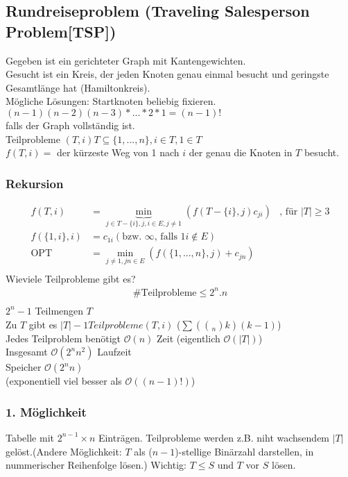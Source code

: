 \subsection{Rundreiseproblem (Traveling Salesperson Problem[TSP])}
Gegeben ist ein gerichteter Graph mit Kantengewichten.\\
Gesucht ist ein Kreis, der jeden Knoten genau einmal besucht und geringste Gesamtlänge hat (Hamiltonkreis).\\
Mögliche Lösungen: Startknoten beliebig fixieren.\\
$(n-1)(n-2)(n-3)*...*2*1=(n-1)!$\\
falls der Graph vollständig ist.\\
Teilprobleme $(T,i) T \subseteq \{1,...,n\}, i \in T, 1 \in T$\\
$f(T,i)=$ der kürzeste Weg von 1 nach $i$ der genau die Knoten in $T$ besucht.\\
\subsubsection{Rekursion}
\begin{align*}
f(T,i) &= \underbrace{\min}_{j \in T-\{i\}, j, i \in E, j \neq 1}(f(T-\{i\},j)c_{ji})&\text{, für } |T| \geq 3\\
f(\{1,i\},i) &= c_{1i} (\text{bzw. }\infty\text{, falls }1i \notin E)\\
\text{OPT}&=\min_{j\neq1, jn \in E}(f(\{1,...,n\},j)+c_{jn})\\
\end{align*}
Wieviele Teilprobleme gibt es?
\begin{align*}
\#\text{Teilprobleme} \leq 2^n.n\\
\end{align*}
$2^n-1$ Teilmengen $T$\\
Zu $T$ gibt es $|T|-1 Teilprobleme (T,i)$ ($\sum (\binom{}n{k})(k-1)$)\\
Jedes Teilproblem benötigt $\mathcal{O}(n)$ Zeit (eigentlich $\mathcal{O}(|T|)$)\\
Insgesamt $\mathcal{O}(2^n n^2)$ Laufzeit\\
Speicher $\mathcal{O}(2^n n)$\\
(exponentiell viel besser als $\mathcal{O}((n-1)!)$)
\subsubsection{1. Möglichkeit}
Tabelle mit $2^{n-1} \times n$ Einträgen. Teilprobleme werden z.B. niht wachsendem $|T|$ gelöst.(Andere Möglichkeit: $T$ als ($n-1$)-stellige Binärzahl darstellen, in nummerischer Reihenfolge lösen.) Wichtig: $T \leq S$ und $T$ vor $S$ lösen.
